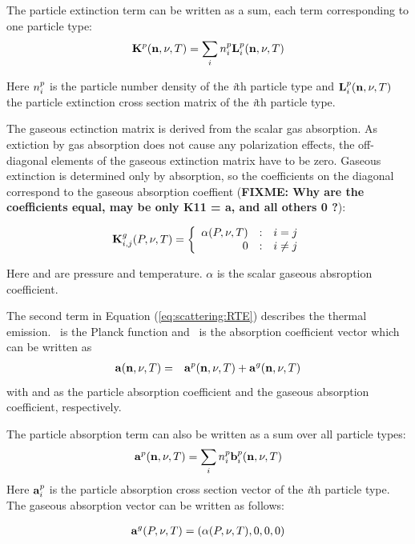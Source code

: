 The particle extinction term can be written as a sum, each term
corresponding to one particle type:
\begin{eqnarray}
  {\bf K}^{p}({\bf n}, \nu, T) = \sum_i n^p_i {\bf L}^{p}_i ({\bf n}, \nu, T)
\end{eqnarray}

Here $n^p_i$ is the particle number density of the {\sl i}th
particle type and ${\bf L}^{p}_i({\bf n}, \nu, T)$ the particle extinction cross
section matrix of the {\sl i}th particle type.


The gaseous ectinction matrix is derived from the scalar gas
absorption. As extiction by gas absorption does not cause any
polarization effects, the off-diagonal elements of the gaseous
extinction matrix have to be zero. Gaseous extinction is determined
only by absorption, so the coefficients on the diagonal correspond to
the gaseous absorption coeffient ({\bf FIXME: Why are the coefficients
  equal, may be only K11 = a, and all others 0 ?}):

\[
\aExtMat{g}_{i,j}(\Prs, \Frq, \Tmp) =
\left\{\begin{array}{r@{\quad:\quad}l} \alpha(\Prs, \Frq, \Tmp) & i =
    j \\ 0 & i \not= j \end{array} \right.
\]

Here \Prs and \Tmp are pressure and temperature. $\alpha$ is the
scalar gaseous absroption coefficient.

The second term in Equation (\ref{eq:scattering:RTE}) describes the
thermal emission. \Planck\ is the Planck function and \AbsVec\ is the
absorption coefficient vector which can be written as
\begin{eqnarray}
  {\bf a} ({\bf n}, \nu, T)  &=& {\bf a}^{p} ({\bf n}, \nu, T) + {\bf a}^{g} ({\bf n}, \nu, T) 
\end{eqnarray}
with  and  as the particle absorption
coefficient and the gaseous absorption coefficient, respectively.

The particle absorption term can also be written as a sum over all
particle types:
\begin{eqnarray}
  {\bf a}^{p}({\bf n}, \nu, T) = \sum_i n^p_i {\bf b}^{p}_i ({\bf n}, \nu, T)
\end{eqnarray}
Here ${\bf a}^{p}_i$ is the particle absorption cross section vector
of the {\sl i}th particle type.  The gaseous absorption vector can be
written as follows:

\begin{eqnarray}
  {\bf a}^{g}(P, \nu, T)  = (\alpha(P, \nu, T), 0, 0, 0) 
\end{eqnarray}


